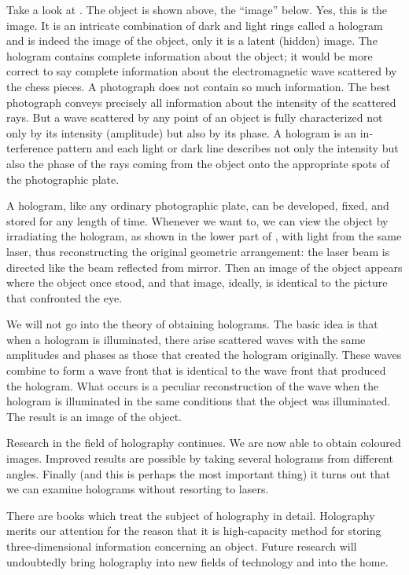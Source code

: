 Take a look at . The object is shown above, the ``image'' below. Yes, this is the image. It is an intri­cate combination of dark and light rings called a hologram and is indeed the image of the object, only it is a latent (hidden) image. The hologram contains complete infor­mation about the object; it would be more correct to say complete information about the electromagnetic wave scattered by the chess pieces. A photograph does not contain so much information. The best photograph conveys precisely all information about the intensity of the scattered rays. But a wave scattered by any point of an object is fully characterized not only by its intensity (amplitude) but also by its phase. A hologram is an in­terference pattern and each light or dark line describes not only the intensity but also the phase of the rays coming from the object onto the appropriate spots of the photographic plate.

A hologram, like any ordinary photographic plate, can be developed, fixed, and stored for any length of time. Whenever we want to, we can view the object by irra­diating the hologram, as shown in the lower part of , with light from the same laser, thus reconstructing the original geometric arrangement: the laser beam is directed like the beam reflected from mirror. Then an image of the object appears where the object once stood, and that image, ideally, is identical to the picture that confronted the eye.

We will not go into the theory of obtaining holograms. The basic idea is that when a hologram is illuminated, there arise scattered waves with the same amplitudes
and phases as those that created the hologram originally. These waves combine to form a wave front that is identi­cal to the wave front that produced the hologram. What occurs is a peculiar reconstruction of the wave when the hologram is illuminated in the same conditions that the object was illuminated. The result is an image of the object.

Research in the field of holography continues. We are now able to obtain coloured images. Improved results are possible by taking several holograms from different angles. Finally (and this is perhaps the most important thing) it turns out that we can examine holograms without resorting to lasers.

There are books which treat the subject of holography in detail. Holography merits our attention for the reason that it is high-capacity method for storing three-dimen­sional information concerning an object. Future research will undoubtedly bring holography into new fields of technology and into the home.


